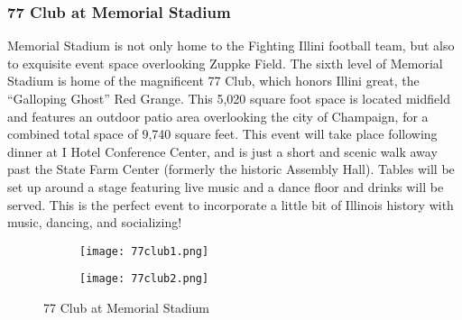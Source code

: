 \subsubsection{77 Club at Memorial Stadium}
Memorial Stadium is not only home to the Fighting Illini football team, but also to exquisite event space overlooking Zuppke Field. The sixth level of Memorial Stadium is home of the magnificent 77 Club, which honors Illini great, the ``Galloping Ghost'' Red Grange. This 5,020 square foot space is located midfield and features an outdoor patio area overlooking the city of Champaign, for a combined total space of 9,740 square feet. This event will take place following dinner at I Hotel Conference Center, and is just a short and scenic walk away past the State Farm Center (formerly the historic Assembly Hall). Tables will be set up around a stage featuring live music and a dance floor and drinks will be served. This is the perfect event to incorporate a little bit of Illinois history with music, dancing, and socializing! 
\vspace{0.5cm}\newline
\begin{figure}[H]

	\centering
	\begin{subfigure}{0.5\textwidth}
		\centering
		\texttt{[image: 77club1.png]}
	\end{subfigure}%
	\begin{subfigure}{0.5\textwidth}
		\centering
		\texttt{[image: 77club2.png]}
	\end{subfigure}
	\caption{77 Club at Memorial Stadium}		
\end{figure} 



